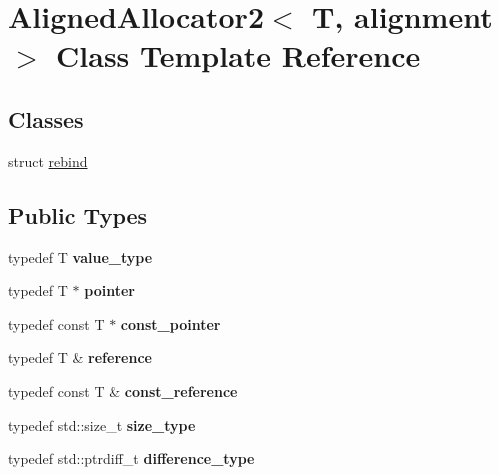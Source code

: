 \hypertarget{classAlignedAllocator2}{}\section{Aligned\+Allocator2$<$ T, alignment $>$ Class Template Reference}
\label{classAlignedAllocator2}
\subsection*{Classes}
\begin{DoxyCompactItemize}
\item 
struct \hyperlink{structAlignedAllocator2_1_1rebind}{rebind}
\end{DoxyCompactItemize}
\subsection*{Public Types}
\begin{DoxyCompactItemize}
\item 
typedef T {\bfseries value\+\_\+type}\hypertarget{classAlignedAllocator2_a7f734b30cdc7bbfb0f519a278da1870a}{}\label{classAlignedAllocator2_a7f734b30cdc7bbfb0f519a278da1870a}

\item 
typedef T $\ast$ {\bfseries pointer}\hypertarget{classAlignedAllocator2_a02d4fa089bf1bd3e50a1c0612c556fd0}{}\label{classAlignedAllocator2_a02d4fa089bf1bd3e50a1c0612c556fd0}

\item 
typedef const T $\ast$ {\bfseries const\+\_\+pointer}\hypertarget{classAlignedAllocator2_a5c47a855c95ef33c3eeca37f0959e815}{}\label{classAlignedAllocator2_a5c47a855c95ef33c3eeca37f0959e815}

\item 
typedef T \& {\bfseries reference}\hypertarget{classAlignedAllocator2_ae38927ee51e59fdbac9bde00a610c430}{}\label{classAlignedAllocator2_ae38927ee51e59fdbac9bde00a610c430}

\item 
typedef const T \& {\bfseries const\+\_\+reference}\hypertarget{classAlignedAllocator2_a40539bddb4e989d0f91a7afc25aa9b9d}{}\label{classAlignedAllocator2_a40539bddb4e989d0f91a7afc25aa9b9d}

\item 
typedef std\+::size\+\_\+t {\bfseries size\+\_\+type}\hypertarget{classAlignedAllocator2_aa9d3b748c6513be70b0e79922b295379}{}\label{classAlignedAllocator2_aa9d3b748c6513be70b0e79922b295379}

\item 
typedef std\+::ptrdiff\+\_\+t {\bfseries difference\+\_\+type}\hypertarget{classAlignedAllocator2_af30a7f0cdea6d7b9fd81bf33365b4de4}{}\label{classAlignedAllocator2_af30a7f0cdea6d7b9fd81bf33365b4de4}

\end{DoxyCompactItemize}
